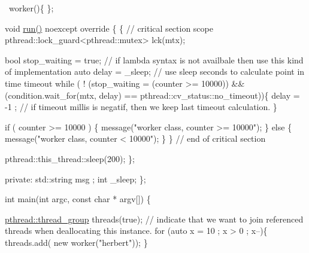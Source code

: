 \begin{DoxyPre}{\ttfamily   ~worker()\{
  \};}\end{DoxyPre}



\begin{DoxyPre}{\ttfamily   void \hyperlink{classpthread_1_1runnable_ad5cfd01857f1d51c42d6a16d09efe930}{run()} noexcept override \{
    \{ // critical section scope
      pthread::lock\_guard<pthread::mutex> lck(mtx);}\end{DoxyPre}



\begin{DoxyPre}{\ttfamily       bool stop\_waiting = true; // if lambda syntax is not availbale then use this kind of implementation
      auto delay = \_sleep; // use sleep seconds to calculate point in time timeout
      while ( ! (stop\_waiting = (counter >= 10000)) \&\& (condition.wait\_for(mtx, delay) == pthread::cv\_status::no\_timeout))\{
        delay = -1 ; // if timeout millis is negatif, then we keep last timeout calculation.
      \}}\end{DoxyPre}



\begin{DoxyPre}{\ttfamily       if ( counter >= 10000 ) \{
        message("worker class, counter >= 10000");
      \} else \{
        message("worker class, counter < 10000");
      \}
    \} // end of critical section}\end{DoxyPre}



\begin{DoxyPre}{\ttfamily     pthread::this\_thread::sleep(200);
  \};}\end{DoxyPre}



\begin{DoxyPre}{\ttfamily private:
  std::string    msg ;
  int            \_sleep;
\};}\end{DoxyPre}



\begin{DoxyPre}{\ttfamily int main(int argc, const char * argv[]) \{}\end{DoxyPre}



\begin{DoxyPre}{\ttfamily   \hyperlink{classpthread_1_1thread__group}{pthread::thread\_group} threads(true); // indicate that we want to join referenced threads when deallocating this instance.
  for (auto x = 10 ; x > 0 ; x--)\{
    threads.add( new worker("herbert"));
  \}}\end{DoxyPre}




